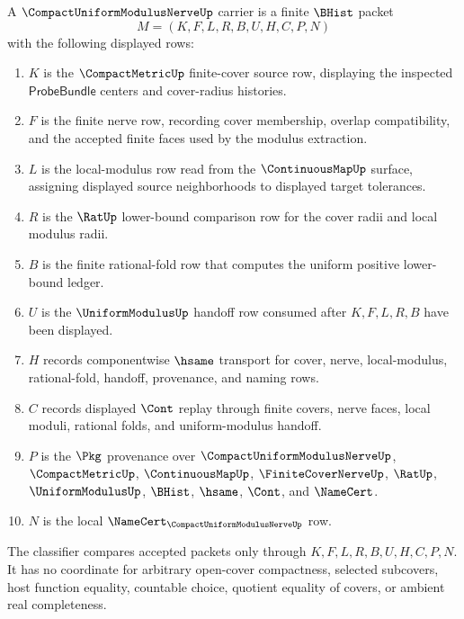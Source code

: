 \begin{definition}
\label{def:compact-uniform-modulus-nerve-carrier}
A $\CompactUniformModulusNerveUp$ carrier is a finite $\BHist$ packet
$$
M=(K,F,L,R,B,U,H,C,P,N)
$$
with the following displayed rows:
\begin{enumerate}
\item $K$ is the $\CompactMetricUp$ finite-cover source row, displaying the inspected $\mathsf{ProbeBundle}$ centers and cover-radius histories.
\item $F$ is the finite nerve row, recording cover membership, overlap compatibility, and the accepted finite faces used by the modulus extraction.
\item $L$ is the local-modulus row read from the $\ContinuousMapUp$ surface, assigning displayed source neighborhoods to displayed target tolerances.
\item $R$ is the $\RatUp$ lower-bound comparison row for the cover radii and local modulus radii.
\item $B$ is the finite rational-fold row that computes the uniform positive lower-bound ledger.
\item $U$ is the $\UniformModulusUp$ handoff row consumed after $K,F,L,R,B$ have been displayed.
\item $H$ records componentwise $\hsame$ transport for cover, nerve, local-modulus, rational-fold, handoff, provenance, and naming rows.
\item $C$ records displayed $\Cont$ replay through finite covers, nerve faces, local moduli, rational folds, and uniform-modulus handoff.
\item $P$ is the $\Pkg$ provenance over $\CompactUniformModulusNerveUp$, $\CompactMetricUp$, $\ContinuousMapUp$, $\FiniteCoverNerveUp$, $\RatUp$, $\UniformModulusUp$, $\BHist$, $\hsame$, $\Cont$, and $\NameCert$.
\item $N$ is the local $\NameCert_{\CompactUniformModulusNerveUp}$ row.
\end{enumerate}
The classifier compares accepted packets only through $K,F,L,R,B,U,H,C,P,N$. It has no coordinate for arbitrary open-cover compactness, selected subcovers, host function equality, countable choice, quotient equality of covers, or ambient real completeness.
\end{definition}

